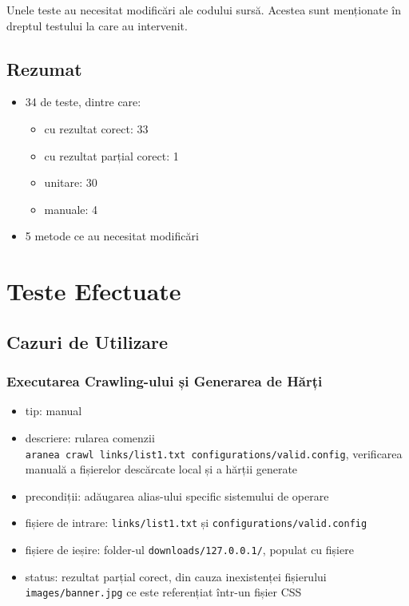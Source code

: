 \documentclass[12pt]{article}
\begin{document}
Unele teste au necesitat modificări ale codului sursă. Acestea sunt menționate în dreptul testului la care au intervenit.

\subsection{Rezumat}

\begin{itemize}
    \item 34 de teste, dintre care:
    \begin{itemize}
        \item cu rezultat corect: 33
        \item cu rezultat parțial corect: 1
        \item unitare: 30
        \item manuale: 4
    \end{itemize}
    \item 5 metode ce au necesitat modificări
\end{itemize}

\newpage

\section{Teste Efectuate}

\subsection{Cazuri de Utilizare}

\subsubsection{Executarea Crawling-ului și Generarea de Hărți}

\begin{itemize}
    \item tip: manual
    \item descriere: rularea comenzii \\ \texttt{aranea crawl links/list1.txt configurations/valid.config}, verificarea manuală a fișierelor descărcate local și a hărții generate
    \item precondiții: adăugarea alias-ului specific sistemului de operare
    \item fișiere de intrare: \texttt{links/list1.txt} și \texttt{configurations/valid.config}
    \item fișiere de ieșire: folder-ul \texttt{downloads/127.0.0.1/}, populat cu fișiere
    \item status: rezultat parțial corect, din cauza inexistenței fișierului \texttt{images/banner.jpg} ce este referențiat într-un fișier CSS
\end{itemize}
\end{document}
